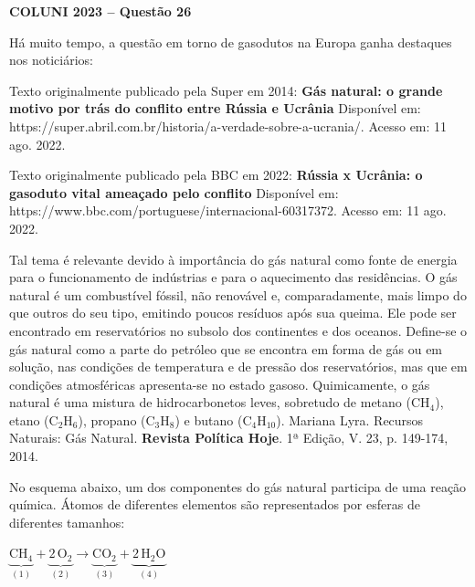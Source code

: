 \textbf{COLUNI 2023 -- Questão 26}\par\medskip Há muito tempo, a questão em torno de gasodutos na Europa ganha destaques nos noticiários:

\par

Texto originalmente publicado pela Super em 2014: \textbf{Gás natural: o grande motivo por trás do conflito entre Rússia e Ucrânia} Disponível em: https://super.abril.com.br/historia/a-verdade-sobre-a-ucrania/. Acesso em: 11 ago. 2022.

\par

Texto originalmente publicado pela BBC em 2022: \textbf{Rússia x Ucrânia: o gasoduto vital ameaçado pelo conflito} Disponível em: https://www.bbc.com/portuguese/internacional-60317372. Acesso em: 11 ago. 2022.

\par

Tal tema é relevante devido à importância do gás natural como fonte de energia para o funcionamento de indústrias e para o aquecimento das residências. O gás natural é um combustível fóssil, não renovável e, comparadamente, mais limpo do que outros do seu tipo, emitindo poucos resíduos após sua queima. Ele pode ser encontrado em reservatórios no subsolo dos continentes e dos oceanos. Define-se o gás natural como a parte do petróleo que se encontra em forma de gás ou em solução, nas condições de temperatura e de pressão dos reservatórios, mas que em condições atmosféricas apresenta-se no estado gasoso. Quimicamente, o gás natural é uma mistura de hidrocarbonetos leves, sobretudo de metano (CH$_4$), etano (C$_2$H$_6$), propano (C$_3$H$_8$) e butano (C$_4$H$_{10}$). Mariana Lyra. Recursos Naturais: Gás Natural. \textbf{Revista Política Hoje}. 1ª Edição, V. 23, p. 149-174, 2014.

\par

No esquema abaixo, um dos componentes do gás natural participa de uma reação química. Átomos de diferentes elementos são representados por esferas de diferentes tamanhos:

\par

\begin{center}\(\underbrace{\mathrm{CH_4}}_{(1)} + \underbrace{2\,\mathrm{O_2}}_{(2)} \longrightarrow \underbrace{\mathrm{CO_2}}_{(3)} + \underbrace{2\,\mathrm{H_2O}}_{(4)}\)\end{center}

